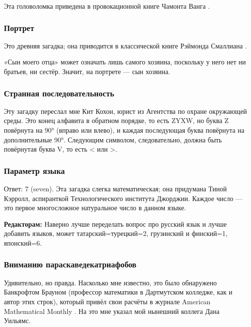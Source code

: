 Эта головоломка приведена в провокационной книге Чамонта Ванга \cite{58}.

\subsubsection*{Портрет}

Это древняя загадка;
она приводится в классической книге Рэймонда Смаллиана \cite{55}.

«Сын моего отца» может означать лишь самого хозяина, поскольку у него нет ни братьев, ни сестёр.
Значит, на портрете — сын хозяина.

\subsubsection*{Странная последовательность}

Эту загадку переслал мне Кит Кохон, юрист из Агентства по охране окружающей среды.
Это конец алфавита в обратном порядке, то есть ZYXW, но буква Z повёрнута на 90° (вправо или влево), и каждая последующая буква повёрнута на дополнительные 90°.
Следующим символом, следовательно, должна быть повёрнутая буква V, то есть < или >.

\subsubsection*{Параметр языка}

Ответ: 7 (seven).
Эта загадка слегка математическая;
она придумана Тиной Кэрролл, аспиранткой Технологического института Джорджии. 
Каждое число — это первое многосложное натуральное число в данном языке.

\begin{addedbytheeditors}
\textbf{Редакторам:}
Наверно лучше переделать вопрос про русский язык и лучше добавить языков, может татарский=турецкий=2, грузинский и финский=1, японский=6.
\end{addedbytheeditors}


\subsubsection*{Вниманию параскаведекатриафобов}

Удивительно, но правда.
Насколько мне известно, это было обнаружено Банкрофтом Брауном (профессор математики в Дартмутском колледже, как и автор этих строк), который привёл свои расчёты в журнале American Mathematical Monthly \cite{11}.
На это мне указал мой нынешний коллега Дана Уильямс.

